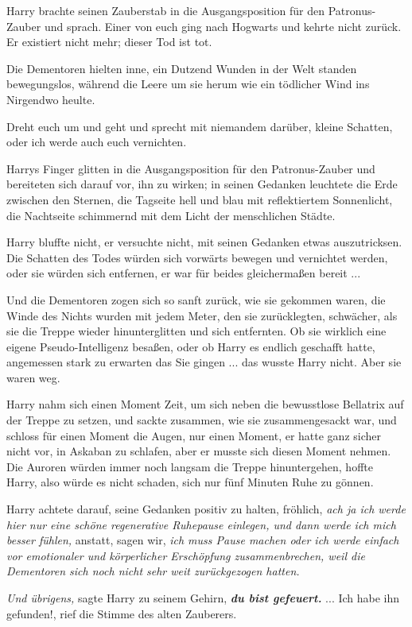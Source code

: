 Harry brachte seinen Zauberstab in die Ausgangsposition für den Patronus-Zauber
und sprach. \glqq{}Einer von euch ging nach Hogwarts und kehrte nicht zurück. Er
existiert nicht mehr; dieser Tod ist tot.\grqq{}

Die Dementoren hielten inne, ein Dutzend Wunden in der Welt standen
bewegungslos, während die Leere um sie herum wie ein tödlicher Wind ins
Nirgendwo heulte.

\glqq{}Dreht euch um und geht und sprecht mit niemandem darüber, kleine Schatten,
oder ich werde auch euch vernichten.\grqq{}

Harrys Finger glitten in die Ausgangsposition für den Patronus-Zauber und
bereiteten sich darauf vor, ihn zu wirken; in seinen Gedanken leuchtete die Erde
zwischen den Sternen, die Tagseite hell und blau mit reflektiertem Sonnenlicht,
die Nachtseite schimmernd mit dem Licht der menschlichen Städte.

Harry bluffte nicht, er versuchte nicht, mit seinen Gedanken etwas
auszutricksen. Die Schatten des Todes würden sich vorwärts bewegen und
vernichtet werden, oder sie würden sich entfernen, er war für beides
gleichermaßen bereit ...

Und die Dementoren zogen sich so sanft zurück, wie sie gekommen waren, die Winde
des Nichts wurden mit jedem Meter, den sie zurücklegten, schwächer, als sie die
Treppe wieder hinunterglitten und sich entfernten. Ob sie wirklich eine eigene
Pseudo-Intelligenz besaßen, oder ob Harry es endlich geschafft hatte, angemessen
stark zu erwarten das Sie gingen ... das wusste Harry nicht. Aber sie waren weg.

Harry nahm sich einen Moment Zeit, um sich neben die bewusstlose Bellatrix auf
der Treppe zu setzen, und sackte zusammen, wie sie zusammengesackt war, und
schloss für einen Moment die Augen, nur einen Moment, er hatte ganz sicher nicht
vor, in Askaban zu schlafen, aber er musste sich diesen Moment nehmen. Die
Auroren würden immer noch langsam die Treppe hinuntergehen, hoffte Harry, also
würde es nicht schaden, sich nur fünf Minuten Ruhe zu gönnen.

Harry achtete darauf, seine Gedanken positiv zu halten, fröhlich, \emph{ach ja
ich werde hier nur eine schöne regenerative Ruhepause einlegen, und dann werde
ich mich besser fühlen,} anstatt, sagen wir, \emph{ich muss Pause machen oder
ich werde einfach vor emotionaler und körperlicher Erschöpfung zusammenbrechen,
weil die Dementoren sich noch nicht sehr weit zurückgezogen hatten.}

\emph{Und übrigens,} sagte Harry zu seinem Gehirn, \textbf{\emph{du bist
gefeuert.} }
\textbf{}
\textbf{}
... \glqq{}Ich habe ihn gefunden!\grqq{}, rief die Stimme des alten Zauberers.

